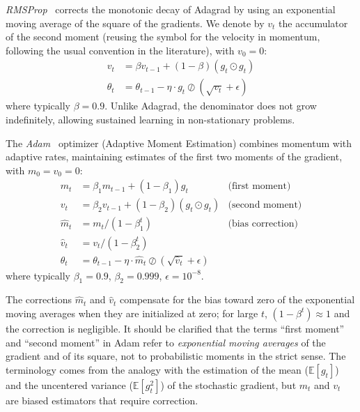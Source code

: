 \begin{definition}[RMSProp]\label{def:rmsprop}
	\textit{RMSProp}~\citep{hinton2012rmsprop} corrects the monotonic decay of Adagrad by using an exponential moving average of the square of the gradients. We denote by \(v_t\) the accumulator of the second moment (reusing the symbol for the velocity in momentum, following the usual convention in the literature), with \(v_0 = 0\):
	\begin{align*}
		v_t &= \beta v_{t-1} + (1-\beta) (g_t \odot g_t) \\
		\theta_t &= \theta_{t-1} - \eta \cdot g_t \oslash (\sqrt{v_t} + \epsilon)
	\end{align*}
	where typically \(\beta = 0.9\). Unlike Adagrad, the denominator does not grow indefinitely, allowing sustained learning in non-stationary problems.
\end{definition}

\begin{definition}[Adam]\label{def:adam}
	The \textit{Adam}~\citep{kingma2014adam} optimizer (Adaptive Moment Estimation) combines momentum with adaptive rates, maintaining estimates of the first two moments of the gradient, with \(m_0 = v_0 = 0\):
	\begin{align*}
		m_t &= \beta_1 m_{t-1} + (1-\beta_1) g_t & \text{(first moment)} \\
		v_t &= \beta_2 v_{t-1} + (1-\beta_2) (g_t \odot g_t) & \text{(second moment)} \\
		\hat{m}_t &= m_t / (1 - \beta_1^t) & \text{(bias correction)} \\
		\hat{v}_t &= v_t / (1 - \beta_2^t) & \\
		\theta_t &= \theta_{t-1} - \eta \cdot \hat{m}_t \oslash (\sqrt{\hat{v}_t} + \epsilon)
	\end{align*}
	where typically \(\beta_1 = 0.9\), \(\beta_2 = 0.999\), \(\epsilon = 10^{-8}\).
\end{definition}

The corrections \(\hat{m}_t\) and \(\hat{v}_t\) compensate for the bias toward zero of the exponential moving averages when they are initialized at zero; for large \(t\), \((1 - \beta^t) \approx 1\) and the correction is negligible. It should be clarified that the terms ``first moment'' and ``second moment'' in \gls{Adam} refer to \textit{exponential moving averages} of the gradient and of its square, not to probabilistic moments in the strict sense. The terminology comes from the analogy with the estimation of the mean (\(\mathbb{E}[g_t]\)) and the uncentered variance (\(\mathbb{E}[g_t^2]\)) of the stochastic gradient, but \(m_t\) and \(v_t\) are biased estimators that require correction.

